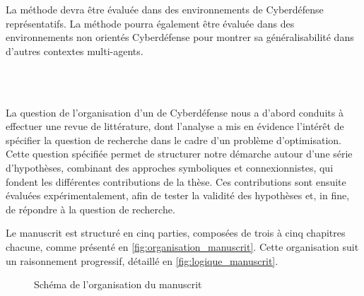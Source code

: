 \noindent La méthode devra être évaluée dans des environnements de Cyberdéfense représentatifs. La méthode pourra également être évaluée dans des environnements non orientés Cyberdéfense pour montrer sa généralisabilité dans d'autres contextes multi-agents.

\

\bigskip

\\

\noindent
La question de l’organisation d’un  de Cyberdéfense nous a d’abord conduits à effectuer une revue de littérature, dont l’analyse a mis en évidence l’intérêt de spécifier la question de recherche dans le cadre d'un problème d’optimisation. Cette question spécifiée permet de structurer notre démarche autour d’une série d’hypothèses, combinant des approches symboliques et connexionnistes, qui fondent les différentes contributions de la thèse. Ces contributions sont ensuite évaluées expérimentalement, afin de tester la validité des hypothèses et, in fine, de répondre à la question de recherche.

\noindent
Le manuscrit est structuré en cinq parties, composées de trois à cinq chapitres chacune, comme présenté en \autoref{fig:organisation_manuscrit}. Cette organisation suit un raisonnement progressif, détaillé en \autoref{fig:logique_manuscrit}.


\begin{figure}[h!]
  \centering
  \resizebox{\textwidth}{!}{%
    
  }
  \caption{Schéma de l'organisation du manuscrit}
  \label{fig:organisation_manuscrit}
\end{figure}

